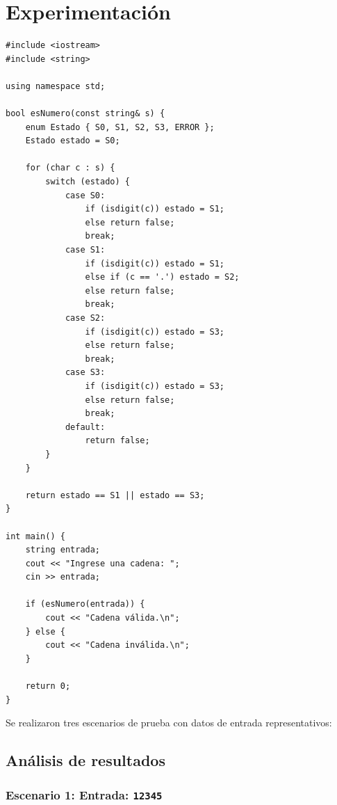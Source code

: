 \documentclass{article}
\begin{document}

\section{Experimentación}\label{sec:exp}

\begin{verbatim}
#include <iostream>
#include <string>

using namespace std;

bool esNumero(const string& s) {
    enum Estado { S0, S1, S2, S3, ERROR };
    Estado estado = S0;

    for (char c : s) {
        switch (estado) {
            case S0:
                if (isdigit(c)) estado = S1;
                else return false;
                break;
            case S1:
                if (isdigit(c)) estado = S1;
                else if (c == '.') estado = S2;
                else return false;
                break;
            case S2:
                if (isdigit(c)) estado = S3;
                else return false;
                break;
            case S3:
                if (isdigit(c)) estado = S3;
                else return false;
                break;
            default:
                return false;
        }
    }

    return estado == S1 || estado == S3;
}

int main() {
    string entrada;
    cout << "Ingrese una cadena: ";
    cin >> entrada;

    if (esNumero(entrada)) {
        cout << "Cadena válida.\n";
    } else {
        cout << "Cadena inválida.\n";
    }

    return 0;
}

\end{verbatim}

Se realizaron tres escenarios de prueba con datos de entrada representativos:
\subsection{Análisis de resultados}

\subsubsection{Escenario 1: Entrada: \texttt{12345} }
\end{document}

